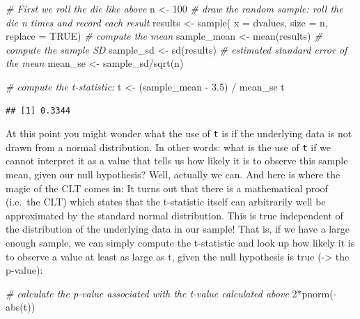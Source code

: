 \documentclass[
  12pt,
]{style/krantz}
\newenvironment{Shaded}{\begin{snugshade}}{\end{snugshade}}
\newcommand{\AttributeTok}[1]{\textcolor[rgb]{0.77,0.63,0.00}{#1}}
\newcommand{\CommentTok}[1]{\textcolor[rgb]{0.56,0.35,0.01}{\textit{#1}}}
\newcommand{\ConstantTok}[1]{\textcolor[rgb]{0.00,0.00,0.00}{#1}}
\newcommand{\DecValTok}[1]{\textcolor[rgb]{0.00,0.00,0.81}{#1}}
\newcommand{\FloatTok}[1]{\textcolor[rgb]{0.00,0.00,0.81}{#1}}
\newcommand{\FunctionTok}[1]{\textcolor[rgb]{0.00,0.00,0.00}{#1}}
\newcommand{\NormalTok}[1]{#1}
\newcommand{\OtherTok}[1]{\textcolor[rgb]{0.56,0.35,0.01}{#1}}
\newcommand{\SpecialCharTok}[1]{\textcolor[rgb]{0.00,0.00,0.00}{#1}}
\begin{document}
\begin{Shaded}
\begin{Highlighting}[]
\CommentTok{\# First we roll the die like above}
\NormalTok{n }\OtherTok{\textless{}{-}} \DecValTok{100}
\CommentTok{\# draw the random sample: \textquotesingle{}roll the die n times and record each result\textquotesingle{}}
\NormalTok{results }\OtherTok{\textless{}{-}} \FunctionTok{sample}\NormalTok{( }\AttributeTok{x =}\NormalTok{ dvalues, }\AttributeTok{size =}\NormalTok{ n, }\AttributeTok{replace =} \ConstantTok{TRUE}\NormalTok{)}
\CommentTok{\# compute the mean}
\NormalTok{sample\_mean }\OtherTok{\textless{}{-}} \FunctionTok{mean}\NormalTok{(results)}
\CommentTok{\# compute the sample SD}
\NormalTok{sample\_sd }\OtherTok{\textless{}{-}} \FunctionTok{sd}\NormalTok{(results)}
\CommentTok{\# estimated standard error of the mean}
\NormalTok{mean\_se }\OtherTok{\textless{}{-}}\NormalTok{ sample\_sd}\SpecialCharTok{/}\FunctionTok{sqrt}\NormalTok{(n)}

\CommentTok{\# compute the t{-}statistic:}
\NormalTok{t }\OtherTok{\textless{}{-}}\NormalTok{ (sample\_mean }\SpecialCharTok{{-}} \FloatTok{3.5}\NormalTok{) }\SpecialCharTok{/}\NormalTok{ mean\_se}
\NormalTok{t}
\end{Highlighting}
\end{Shaded}

\begin{verbatim}
## [1] 0.3344
\end{verbatim}

At this point you might wonder what the use of \texttt{t} is if the underlying data is not drawn from a normal distribution. In other words: what is the use of \texttt{t} if we cannot interpret it as a value that tells us how likely it is to observe this sample mean, given our null hypothesis? Well, actually we can. And here is where the magic of the CLT comes in: It turns out that there is a mathematical proof (i.e.~the CLT) which states that the t-statistic itself can arbitrarily well be approximated by the standard normal distribution. This is true independent of the distribution of the underlying data in our sample! That is, if we have a large enough sample, we can simply compute the t-statistic and look up how likely it is to observe a value at least as large as t, given the null hypothesis is true (-\textgreater{} the p-value):

\begin{Shaded}
\begin{Highlighting}[]
\CommentTok{\# calculate the p{-}value associated with the t{-}value calculated above}
\DecValTok{2}\SpecialCharTok{*}\FunctionTok{pnorm}\NormalTok{(}\SpecialCharTok{{-}}\FunctionTok{abs}\NormalTok{(t))}
\end{Highlighting}
\end{Shaded}
\end{document}
